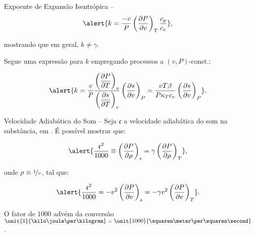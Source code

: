\begin{frame}[allowframebreaks]{Expoente de Expansão Isentrópica --}
        \begin{equation*}
            \alert{
                k =
                    \frac{-v}{P}
                    \left(
                        \frac{\partial P}{\partial v}
                    \right)_T
                    \frac{c_p}{c_v}
            },
        \end{equation*}

        \noindent mostrando que \alert{em geral, $k \neq \gamma$}.

        \pagebreak
        Segue uma expressão para \alert{$k$} empregando processos a \alert{$(v, P)$-const.}:

        \begin{equation*}
            \alert{
                k =
                    \frac{v}{P}
                    \frac{
                        \left(\dfrac{\partial P}{\partial T}\right)_{v}
                    }{
                        \left(\dfrac{\partial s}{\partial T}\right)_{v}
                    }
                    \left(\frac{\partial s}{\partial v}\right)_{P} =
                    \frac{vT\beta}{P\kappa_Tc_v}
                    \left(\frac{\partial s}{\partial v}\right)_{P}
            }.
        \end{equation*}

    \end{frame}

    \begin{frame}[allowframebreaks]{Velocidade Adiabática do Som --}\vspace*{-0em}
        Seja \alert{$\mathfrak{c}$} a \alert{velocidade adiabática do som} na substância, em
        \alert{\meter\per\second}. É possível mostrar que:

        \begin{equation*}
            \alert{
                \frac{\mathfrak{c}^2}{1000} \equiv
                \left(\frac{\partial P}{\partial\rho}\right)_s =
                \gamma\left(\frac{\partial P}{\partial\rho}\right)_T
            },
        \end{equation*}\vspace*\medskipamount

        \noindent onde \alert{$\rho \equiv \nicefrac{1}{v}$}, tal que:

        \begin{equation*}
            \alert{
                \frac{\mathfrak{c}^2}{1000} =
                -v^2 \left(\frac{\partial P}{\partial v}\right)_s =
                -\gamma v^2 \left(\frac{\partial P}{\partial v}\right)_T
            }.
        \end{equation*}\vspace*\medskipamount

        O fator de \alert{$1000$} advém da conversão \alert{$\unit{1}{\kilo\joule\per\kilogram}
        = \unit{1000}{\squaren\meter\per\squaren\second}$}.

    \end{frame}

